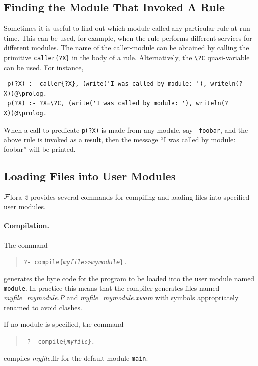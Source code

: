 \documentclass[11pt]{article}
\newcommand{\FLORA}{{\mbox{\sc ${\cal F}${lora}\rm\emph{-2}}}\xspace}
\newcommand{\FLSYSTEM}{\FLORA}
\newcommand{\flrext}{flr\xspace}
\newcommand{\bs}{\textbackslash}
\newcommand{\ofile}{xwam}
\begin{document}
\subsection{Finding the Module That Invoked A Rule}

\index{{\tt \bs{}?C} quasi-variable}
Sometimes it is useful to find out which module called any particular rule
at run time. This can be used, for example, when the rule performs
different services for different modules. The name of the caller-module can
be obtained by calling the primitive {\tt caller\{?X\}}  in the body of a rule.
Alternatively, the \texttt{\bs{}?C} quasi-variable can be used. 
For instance, 
\begin{verbatim}
 p(?X) :- caller{?X}, (write('I was called by module: '), writeln(?X))@\prolog.
 p(?X) :- ?X=\?C, (write('I was called by module: '), writeln(?X))@\prolog.
\end{verbatim}

When a call to predicate {\tt p(?X)} is made from any module, say {\tt
  foobar}, and the above rule is invoked as a result, then the message ``I
  was called by module: foobar'' will be printed. 


\subsection{Loading Files into User Modules}\label{sec-loading-mods}


\FLSYSTEM provides several commands for compiling and loading files into
specified user modules.

\paragraph{Compilation.}
The command 
\begin{quote}
  {\tt ?- compile\{{\it myfile}>{}>{\it mymodule}\}.}
\end{quote}
generates the byte code for the program to be loaded into the user module
named {\tt module}. In
practice this means that the compiler generates files named
\emph{myfile\_mymodule.P} and \emph{myfile\_mymodule.\ofile} with symbols appropriately
renamed to avoid clashes.

If no module is specified, the command
\begin{quote}
 \tt
 ?- compile\{{\it myfile}\}.
\end{quote}
compiles {\it myfile}.\flrext for the default module {\tt main}.
\end{document}
